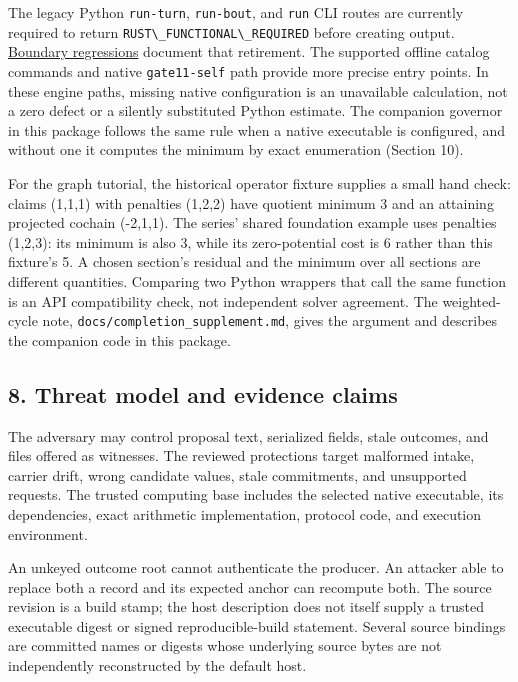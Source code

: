 \documentclass[
  11pt,
]{article}
\newcommand{\passthrough}[1]{#1}
\begin{document}
The legacy Python \passthrough{\lstinline!run-turn!},
\passthrough{\lstinline!run-bout!}, and \passthrough{\lstinline!run!}
CLI routes are currently required to return
\passthrough{\lstinline!RUST\_FUNCTIONAL\_REQUIRED!} before creating
output.
\href{https://github.com/dbccpage/the_symbol_game/blob/52cb5457f6c485ba548cfd292f6012a941ed22cf/omega_engine_symbol_game/tests/test_functional_boundary.py}{Boundary
regressions} document that retirement. The supported offline catalog
commands and native \passthrough{\lstinline!gate11-self!} path provide
more precise entry points. In these engine paths, missing native
configuration is an unavailable calculation, not a zero defect or a
silently substituted Python estimate. The companion governor in this
package follows the same rule when a native executable is configured,
and without one it computes the minimum by exact enumeration (Section
10).

For the graph tutorial, the historical operator fixture supplies a small
hand check: claims (1,1,1) with penalties (1,2,2) have quotient minimum
3 and an attaining projected cochain (-2,1,1). The series' shared
foundation example uses penalties (1,2,3): its minimum is also 3, while
its zero-potential cost is 6 rather than this fixture's 5. A chosen
section's residual and the minimum over all sections are different
quantities. Comparing two Python wrappers that call the same function is
an API compatibility check, not independent solver agreement. The
weighted-cycle note, \nolinkurl{docs/completion_supplement.md}, gives
the argument and describes the companion code in this package.

\subsection{8. Threat model and evidence
claims}\label{threat-model-and-evidence-claims}

The adversary may control proposal text, serialized fields, stale
outcomes, and files offered as witnesses. The reviewed protections
target malformed intake, carrier drift, wrong candidate values, stale
commitments, and unsupported requests. The trusted computing base
includes the selected native executable, its dependencies, exact
arithmetic implementation, protocol code, and execution environment.

An unkeyed outcome root cannot authenticate the producer. An attacker
able to replace both a record and its expected anchor can recompute
both. The source revision is a build stamp; the host description does
not itself supply a trusted executable digest or signed
reproducible-build statement. Several source bindings are committed
names or digests whose underlying source bytes are not independently
reconstructed by the default host.
\end{document}
